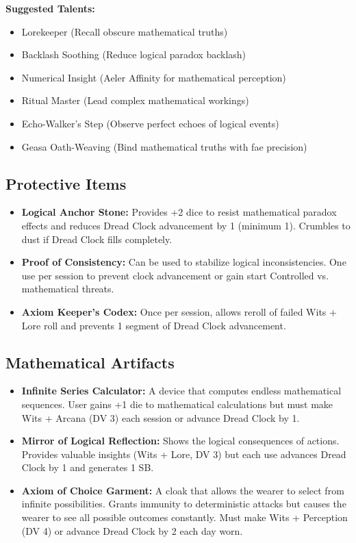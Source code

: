 \documentclass[11pt]{article}
\begin{document}
\textbf{Suggested Talents:}
\begin{itemize}
\item Lorekeeper (Recall obscure mathematical truths)
\item Backlash Soothing (Reduce logical paradox backlash)
\item Numerical Insight (Aeler Affinity for mathematical perception)
\item Ritual Master (Lead complex mathematical workings)
\item Echo-Walker's Step (Observe perfect echoes of logical events)
\item Geasa Oath-Weaving (Bind mathematical truths with fae precision)
\end{itemize}

\subsection{Protective Items}

\begin{itemize}
\item \textbf{Logical Anchor Stone:} Provides +2 dice to resist mathematical paradox effects and reduces Dread Clock advancement by 1 (minimum 1). Crumbles to dust if Dread Clock fills completely.
\item \textbf{Proof of Consistency:} Can be used to stabilize logical inconsistencies. One use per session to prevent clock advancement or gain start Controlled vs. mathematical threats.
\item \textbf{Axiom Keeper's Codex:} Once per session, allows reroll of failed Wits + Lore roll and prevents 1 segment of Dread Clock advancement.
\end{itemize}

\subsection{Mathematical Artifacts}

\begin{itemize}
\item \textbf{Infinite Series Calculator:} A device that computes endless mathematical sequences. User gains +1 die to mathematical calculations but must make Wits + Arcana (DV 3) each session or advance Dread Clock by 1.
\item \textbf{Mirror of Logical Reflection:} Shows the logical consequences of actions. Provides valuable insights (Wits + Lore, DV 3) but each use advances Dread Clock by 1 and generates 1 SB.
\item \textbf{Axiom of Choice Garment:} A cloak that allows the wearer to select from infinite possibilities. Grants immunity to deterministic attacks but causes the wearer to see all possible outcomes constantly. Must make Wits + Perception (DV 4) or advance Dread Clock by 2 each day worn.
\end{itemize}
\end{document}
